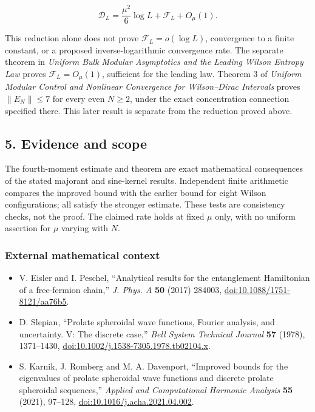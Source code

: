 \documentclass[
  10pt,
  a4paper,
]{article}
\providecommand{\tightlist}{%
  \setlength{\itemsep}{0pt}\setlength{\parskip}{0pt}}
\begin{document}
\[
\boxed{\mathcal D_L=\frac{\mu^2}{6}\log L+\mathcal F_L+O_\mu(1).}
\]

This reduction alone does not prove \(\mathcal F_L=o(\log L)\), convergence to a finite constant, or a proposed inverse-logarithmic convergence rate. The separate theorem in \emph{Uniform Bulk Modular Asymptotics and the Leading Wilson Entropy Law} proves \(\mathcal F_L=O_\mu(1)\), sufficient for the leading law. Theorem 3 of \emph{Uniform Modular Control and Nonlinear Convergence for Wilson--Dirac Intervals} proves \(\|E_N\|\le7\) for every even \(N\ge2\), under the exact concentration connection specified there. This later result is separate from the reduction proved above.

\subsection{5. Evidence and scope}\label{evidence-and-scope}

The fourth-moment estimate and theorem are exact mathematical consequences of the stated majorant and sine-kernel results. Independent finite arithmetic compares the improved bound with the earlier bound for eight Wilson configurations; all satisfy the stronger estimate. These tests are consistency checks, not the proof. The claimed rate holds at fixed \(\mu\) only, with no uniform assertion for \(\mu\) varying with \(N\).

\subsubsection{External mathematical context}\label{external-mathematical-context}

\begin{itemize}
\tightlist
\item
  V. Eisler and I. Peschel, ``Analytical results for the entanglement Hamiltonian of a free-fermion chain,'' \emph{J. Phys. A} \textbf{50} (2017) 284003, \url{doi:10.1088/1751-8121/aa76b5}.
\item
  D. Slepian, ``Prolate spheroidal wave functions, Fourier analysis, and uncertainty. V: The discrete case,'' \emph{Bell System Technical Journal} \textbf{57} (1978), 1371--1430, \url{doi:10.1002/j.1538-7305.1978.tb02104.x}.
\item
  S. Karnik, J. Romberg and M. A. Davenport, ``Improved bounds for the eigenvalues of prolate spheroidal wave functions and discrete prolate spheroidal sequences,'' \emph{Applied and Computational Harmonic Analysis} \textbf{55} (2021), 97--128, \url{doi:10.1016/j.acha.2021.04.002}.
\end{itemize}
\end{document}
